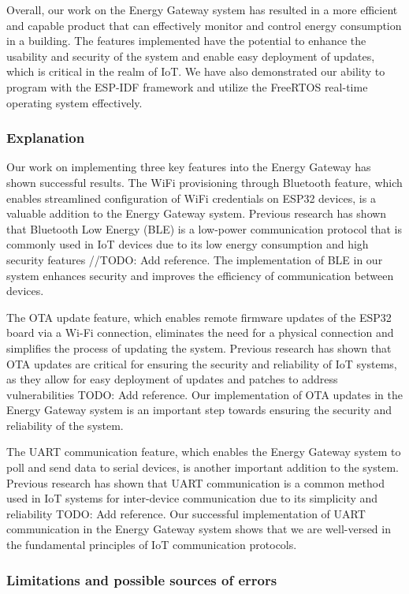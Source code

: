 Overall, our work on the Energy Gateway system has resulted in a more efficient and capable product that can effectively monitor and control energy consumption in a building. The features implemented have the potential to enhance the usability and security of the system and enable easy deployment of updates, which is critical in the realm of IoT. We have also demonstrated our ability to program with the ESP-IDF framework and utilize the FreeRTOS real-time operating system effectively.

\subsubsection{Explanation}
\label{sec:explanation}

Our work on implementing three key features into the Energy Gateway has shown successful results. The WiFi provisioning through Bluetooth feature, which enables streamlined configuration of WiFi credentials on ESP32 devices, is a valuable addition to the Energy Gateway system. Previous research has shown that Bluetooth Low Energy (BLE) is a low-power communication protocol that is commonly used in IoT devices due to its low energy consumption and high security features //TODO: Add reference. The implementation of BLE in our system enhances security and improves the efficiency of communication between devices.

The OTA update feature, which enables remote firmware updates of the ESP32 board via a Wi-Fi connection, eliminates the need for a physical connection and simplifies the process of updating the system. Previous research has shown that OTA updates are critical for ensuring the security and reliability of IoT systems, as they allow for easy deployment of updates and patches to address vulnerabilities TODO: Add reference. Our implementation of OTA updates in the Energy Gateway system is an important step towards ensuring the security and reliability of the system.

The UART communication feature, which enables the Energy Gateway system to poll and send data to serial devices, is another important addition to the system. Previous research has shown that UART communication is a common method used in IoT systems for inter-device communication due to its simplicity and reliability TODO: Add reference. Our successful implementation of UART communication in the Energy Gateway system shows that we are well-versed in the fundamental principles of IoT communication protocols.

\subsubsection{Limitations and possible sources of errors}
\label{sec:limitations}